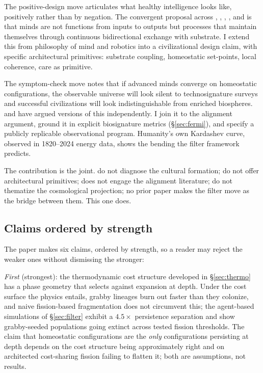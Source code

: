 \documentclass[11pt,a4paper,twocolumn]{article}
\begin{document}
The positive-design move articulates what healthy intelligence looks
like, positively rather than by negation. The convergent proposal
across \citet{man2019}, \citet{thompson2007}, \citet{froese2009},
\citet{cannon2022}, and \citet{pihlakas2024} is that minds are not
functions from inputs to outputs but processes that maintain
themselves through continuous bidirectional exchange with substrate.
I extend this from philosophy of mind and robotics into a
civilizational design claim, with specific architectural primitives:
substrate coupling, homeostatic set-points, local coherence, care as
primitive.

The symptom-check move notes that if advanced minds converge on
homeostatic configurations, the observable universe will look silent
to technosignature surveys and successful civilizations will look
indistinguishable from enriched biospheres. \citet{cirkovic2018} and
\citet{sandberg2018} have argued versions of this independently. I
join it to the alignment argument, ground it in explicit biosignature
metrics (\S\ref{sec:fermi}), and specify a publicly replicable
observational program. Humanity's own Kardashev curve, observed in
1820--2024 energy data, shows the bending the filter framework
predicts.

The contribution is the joint. \citet{man2019} do not diagnose the
cultural formation; \citet{gebru2024} do not offer architectural
primitives; \citet{cirkovic2018} does not engage the alignment
literature; \citet{muller2022} do not thematize the cosmological
projection; no prior paper makes the filter move as the bridge
between them. This one does.

\subsection{Claims ordered by strength}

The paper makes six claims, ordered by strength, so a reader may
reject the weaker ones without dismissing the stronger:

\emph{First} (strongest): the thermodynamic cost structure developed
in \S\ref{sec:thermo} has a phase geometry that selects against
expansion at depth. Under the cost surface the physics entails,
grabby lineages burn out faster than they colonize, and naive
fission-based fragmentation does not circumvent this; the agent-based
simulations of \S\ref{sec:filter} exhibit a $4.5\times$ persistence
separation and show grabby-seeded populations going extinct across
tested fission thresholds. The claim that homeostatic configurations
are the \emph{only} configurations persisting at depth depends on the
cost structure being approximately right and on architected
cost-sharing fission failing to flatten it; both are assumptions, not
results.
\end{document}
